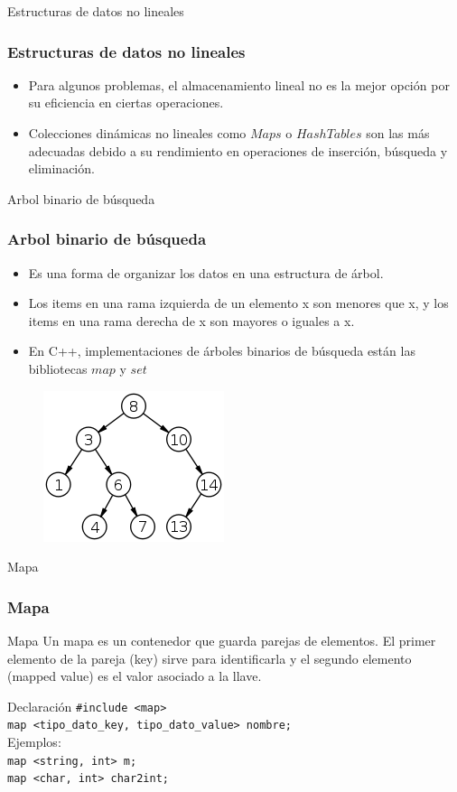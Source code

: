 \documentclass{beamer}
\begin{document}
\begin{section}{Estructuras de datos no lineales}
	\begin{frame}
		\frametitle{Estructuras de datos no lineales}
		\begin{itemize}
			\item {Para algunos problemas, el almacenamiento lineal no es la mejor opción por su eficiencia en ciertas operaciones.}
			\item {Colecciones dinámicas no lineales como $Maps$ o $Hash Tables$ son las más adecuadas debido a su rendimiento en operaciones de inserción, búsqueda y eliminación.}
		\end{itemize}
	\end{frame}

\begin{subsection}{Arbol binario de búsqueda}
	\begin{frame}
		\frametitle{Arbol binario de búsqueda}
		\begin{itemize}
			\item {Es una forma de organizar los datos en una estructura de árbol.}
			\item {Los items en una rama izquierda de un elemento x son menores que x, y los items en una rama derecha de x son mayores o iguales a x.}
			\item {En C++, implementaciones de árboles binarios de búsqueda están las bibliotecas $map$ y $set$}
		\end{itemize}
		\begin{figure}
			\includegraphics[scale=0.6]{src/bst.jpg}
		\end{figure}
	\end{frame}

\begin{subsubsection}{Mapa}
	\begin{frame}[fragile]
		\frametitle{Mapa}
		\begin{block}{Mapa}
			Un mapa es un contenedor que guarda parejas de elementos. El primer elemento de la pareja (key) sirve para identificarla y el segundo elemento (mapped value) es el valor asociado a la llave.\\
		\end{block}
		\begin{block}{Declaración}
			\verb|#include <map>|\\
			\verb|map <tipo_dato_key, tipo_dato_value> nombre;|\\
			Ejemplos:\\
			\verb|map <string, int> m;|\\
			\verb|map <char, int> char2int;|
		\end{block}
	\end{frame}
	

\end{subsubsection}
\end{subsection}
\end{section}
\end{document}
